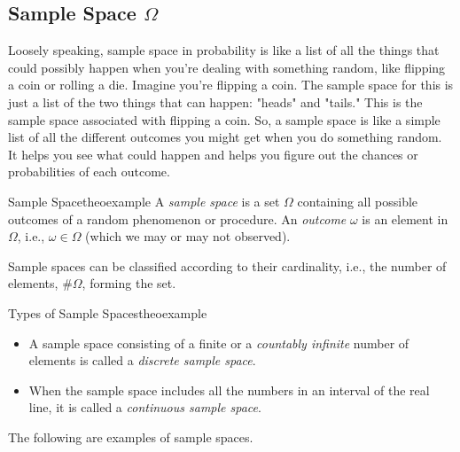 \documentclass{tufte-handout}
\begin{document}
\subsection{Sample Space $\Omega$}

Loosely speaking,  sample space in probability is like a list of all the things that could possibly happen when you're dealing with something random, like flipping a coin or rolling a die. Imagine you're flipping a coin. The sample space for this is just a list of the two things that can happen: "heads" and "tails." This is the sample space associated with flipping a coin.  So, a sample space is like a simple list of all the different outcomes you might get when you do something random. It helps you see what could happen and helps you figure out the chances or probabilities of each outcome.

\begin{mydef}{Sample Space}{theoexample}     
A \textit{sample space} is a set $\Omega$ containing all possible outcomes of a random phenomenon or procedure.
An \textit{outcome} $\omega$  is an element in $\Omega$, i.e., $\omega \in \Omega$ (which we may or may not observed).
\end{mydef}


Sample spaces can be classified according to their cardinality, i.e., the number of elements, $\# \Omega$, forming the set.
\begin{mydef}{Types of Sample Spaces}{theoexample}
\begin{itemize}
\item A sample space consisting of a finite or a \textit{countably infinite} number of elements is called a
\textit{discrete sample space}.
\item When the sample space includes all the numbers in an interval of the real line, it is called a
\textit{continuous sample space}. 
\end{itemize} 
\end{mydef}
The following are examples of sample spaces.
\end{document}
